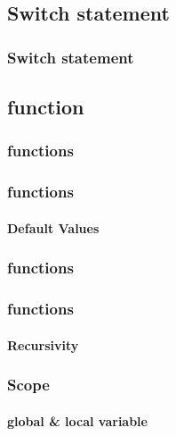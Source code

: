\documentclass[hyperref={pdfpagelabels=true}]{beamer}
\begin{document}
\subsection{Switch statement}

\begin{frame}
\frametitle{Switch statement}
\scriptsize{
\begin{tcolorbox}[title=  ,width=9.85 cm]

\end{tcolorbox}}
\end{frame}

\subsection{function}

\begin{frame}[shrink]
\frametitle{functions}
\begin{tcolorbox}[title= ,width=11.5 cm]

\end{tcolorbox}
\end{frame}

\begin{frame}[shrink]
\frametitle{functions}
\framesubtitle{Default Values}
\begin{tcolorbox}[title= ,width=11.5 cm]

\end{tcolorbox}
\end{frame}

\begin{frame}[shrink]
\frametitle{functions}
\begin{tcolorbox}[title= ,width=15.5 cm]

\end{tcolorbox}
\end{frame}

\begin{frame}[shrink]
\frametitle{functions}
\framesubtitle{Recursivity}
\begin{tcolorbox}[title= ,width=15.5 cm]

\end{tcolorbox}
\end{frame}

\begin{frame}[shrink]
\frametitle{Scope}
\framesubtitle{global \& local variable}
\begin{tcolorbox}[title= ,width=15.5 cm]

\end{tcolorbox}
\end{frame}
\end{document}
